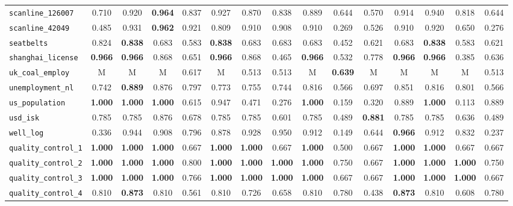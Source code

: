 \begin{tabular}{lcccccccccccccc}
\verb+scanline_126007+ & 0.710 & 0.920 & \textbf{0.964} & 0.837 & 0.927 & 0.870 & 0.838 & 0.889 & 0.644 & 0.570 & 0.914 & 0.940 & 0.818 & 0.644\\
\verb+scanline_42049+ & 0.485 & 0.931 & \textbf{0.962} & 0.921 & 0.809 & 0.910 & 0.908 & 0.910 & 0.269 & 0.526 & 0.910 & 0.920 & 0.650 & 0.276\\
\verb+seatbelts+ & 0.824 & \textbf{0.838} & 0.683 & 0.583 & \textbf{0.838} & 0.683 & 0.683 & 0.683 & 0.452 & 0.621 & 0.683 & \textbf{0.838} & 0.583 & 0.621\\
\verb+shanghai_license+ & \textbf{0.966} & \textbf{0.966} & 0.868 & 0.651 & \textbf{0.966} & 0.868 & 0.465 & \textbf{0.966} & 0.532 & 0.778 & \textbf{0.966} & \textbf{0.966} & 0.385 & 0.636\\
\verb+uk_coal_employ+ & M & M & M & 0.617 & M & 0.513 & 0.513 & M & \textbf{0.639} & M & M & M & M & 0.513\\
\verb+unemployment_nl+ & 0.742 & \textbf{0.889} & 0.876 & 0.797 & 0.773 & 0.755 & 0.744 & 0.816 & 0.566 & 0.697 & 0.851 & 0.816 & 0.801 & 0.566\\
\verb+us_population+ & \textbf{1.000} & \textbf{1.000} & \textbf{1.000} & 0.615 & 0.947 & 0.471 & 0.276 & \textbf{1.000} & 0.159 & 0.320 & 0.889 & \textbf{1.000} & 0.113 & 0.889\\
\verb+usd_isk+ & 0.785 & 0.785 & 0.876 & 0.678 & 0.785 & 0.785 & 0.601 & 0.785 & 0.489 & \textbf{0.881} & 0.785 & 0.785 & 0.636 & 0.489\\
\verb+well_log+ & 0.336 & 0.944 & 0.908 & 0.796 & 0.878 & 0.928 & 0.950 & 0.912 & 0.149 & 0.644 & \textbf{0.966} & 0.912 & 0.832 & 0.237\\
\midrule
\verb+quality_control_1+ & \textbf{1.000} & \textbf{1.000} & \textbf{1.000} & 0.667 & \textbf{1.000} & \textbf{1.000} & 0.667 & \textbf{1.000} & 0.500 & 0.667 & \textbf{1.000} & \textbf{1.000} & 0.667 & 0.667\\
\verb+quality_control_2+ & \textbf{1.000} & \textbf{1.000} & \textbf{1.000} & 0.800 & \textbf{1.000} & \textbf{1.000} & \textbf{1.000} & \textbf{1.000} & 0.750 & 0.667 & \textbf{1.000} & \textbf{1.000} & \textbf{1.000} & 0.750\\
\verb+quality_control_3+ & \textbf{1.000} & \textbf{1.000} & \textbf{1.000} & 0.766 & \textbf{1.000} & \textbf{1.000} & \textbf{1.000} & \textbf{1.000} & 0.667 & 0.667 & \textbf{1.000} & \textbf{1.000} & \textbf{1.000} & 0.667\\
\verb+quality_control_4+ & 0.810 & \textbf{0.873} & 0.810 & 0.561 & 0.810 & 0.726 & 0.658 & 0.810 & 0.780 & 0.438 & \textbf{0.873} & 0.810 & 0.608 & 0.780\\

\end{tabular}
